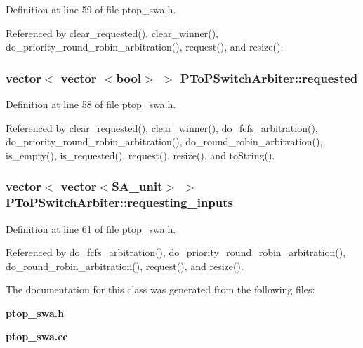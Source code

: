 Definition at line 59 of file ptop\_\-swa.h.

Referenced by clear\_\-requested(), clear\_\-winner(), do\_\-priority\_\-round\_\-robin\_\-arbitration(), request(), and resize().
\subsubsection[{requested}]{\setlength{\rightskip}{0pt plus 5cm}vector$<$ vector $<$bool$>$ $>$ {\bf PToPSwitchArbiter::requested}\hspace{0.3cm}{\tt  [private]}}\label{classPToPSwitchArbiter_191d12127b578016fc532f2fc00677c2}




Definition at line 58 of file ptop\_\-swa.h.

Referenced by clear\_\-requested(), clear\_\-winner(), do\_\-fcfs\_\-arbitration(), do\_\-priority\_\-round\_\-robin\_\-arbitration(), do\_\-round\_\-robin\_\-arbitration(), is\_\-empty(), is\_\-requested(), request(), resize(), and toString().
\subsubsection[{requesting\_\-inputs}]{\setlength{\rightskip}{0pt plus 5cm}vector$<$ vector$<${\bf SA\_\-unit}$>$ $>$ {\bf PToPSwitchArbiter::requesting\_\-inputs}\hspace{0.3cm}{\tt  [private]}}\label{classPToPSwitchArbiter_56dde672e0b26a80ee6a9491695bfa75}




Definition at line 61 of file ptop\_\-swa.h.

Referenced by do\_\-fcfs\_\-arbitration(), do\_\-priority\_\-round\_\-robin\_\-arbitration(), do\_\-round\_\-robin\_\-arbitration(), request(), and resize().

The documentation for this class was generated from the following files:\begin{CompactItemize}
\item 
{\bf ptop\_\-swa.h}\item 
{\bf ptop\_\-swa.cc}\end{CompactItemize}
